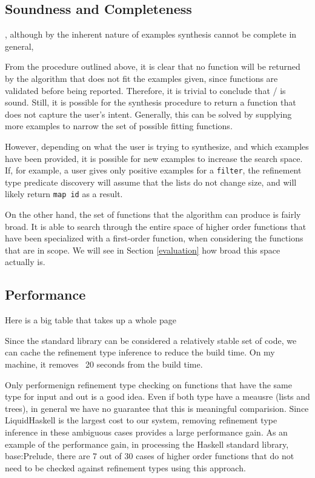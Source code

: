 \subsection{Soundness and Completeness}\label{sound}
, although by the inherent nature of examples synthesis cannot be complete in general, 

From the procedure outlined above, it is clear that no function will be returned by the algorithm that does not fit the examples given, since functions are validated before being reported. Therefore, it is trivial to conclude that \ourTool/ is sound. Still, it is possible for the synthesis procedure to return a function that does not capture the user's intent. Generally, this can be solved by supplying more examples to narrow the set of possible fitting functions.

However, depending on what the user is trying to synthesize, and which examples have been provided, it is possible for new examples to increase the search space. If, for example, a user gives only positive examples for a \texttt{filter}, the refinement type predicate discovery will assume that the lists do not change size, and will likely return \texttt{map id} as a result.

On the other hand, the set of functions that the algorithm can produce is fairly broad. It is able to search through the entire space of higher order functions that have been specialized with a first-order function, when considering the functions that are in scope. We will see in Section \ref{evaluation} how broad this space actually is. 


\subsection{Performance}

Here is a big table that takes up a whole page

Since the standard library can be considered a relatively stable set of code, we can cache the refinement type inference to reduce the build time.
On my machine, it removes ~20 seconds from the build time.


Only performenign refinement type checking on functions that have the same type for input and out is a good idea. 
Even if both type have a meausre (lists and trees), in general we have no guarantee that this is meaningful comparision.
Since LiquidHaskell is the largest cost to our system, removing refinement type inference in these ambiguous cases provides a large performance gain.
As an example of the performance gain, in processing the Haskell standard library, base:Prelude, there are 7 out of 30 cases of higher order functions that do not need to be checked against refinement types using this approach.

